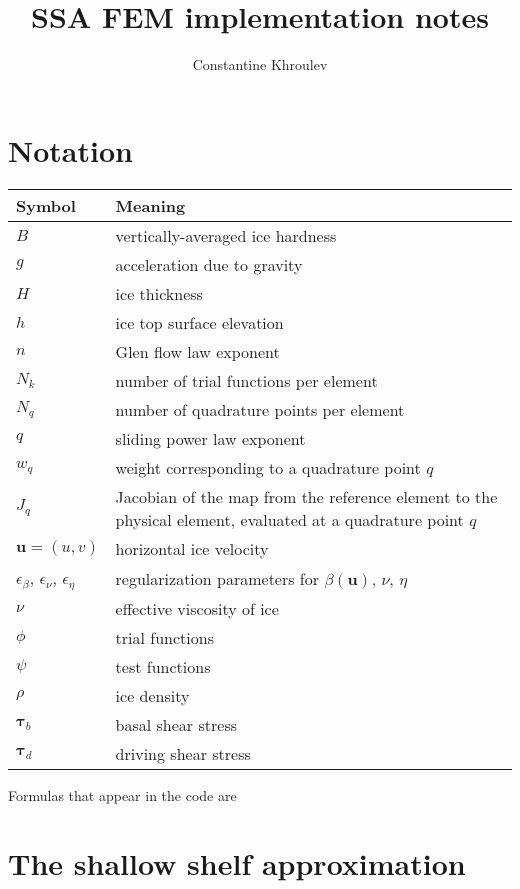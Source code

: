 \documentclass{amsart}
\newcommand{\betaU}{\beta(\boldsymbol{u})}
\newcommand{\basalshearstress}[1]{\boldsymbol{\tau}_{b#1}}
\newcommand{\taub}{\basalshearstress{}}
\newcommand{\drivingstress}[1]{\boldsymbol{\tau}_{d#1}}
\newcommand{\taud}{\drivingstress{}}
\newcommand{\highlight}[1]{{\color{red!80!black} \fbox{$ \displaystyle #1 $} }}
\begin{document}
\title{SSA FEM implementation notes}
\author{Constantine Khroulev}
\maketitle
\tableofcontents


\section{Notation}
\label{sec-1}

\begin{center}
\begin{tabular}{lp{}}
Symbol & Meaning\\
\hline
$B$ & vertically-averaged ice hardness\\
$g$ & acceleration due to gravity\\
$H$ & ice thickness\\
$h$ & ice top surface elevation\\
$n$ & Glen flow law exponent\\
$N_k$ & number of trial functions per element\\
$N_q$ & number of quadrature points per element\\
$q$ & sliding power law exponent\\
$w_q$ & weight corresponding to a quadrature point $q$\\
$J_q$ & Jacobian of the map from the reference element to the physical element, evaluated at a quadrature point $q$\\
$\boldsymbol{u} = (u,v)$ & horizontal ice velocity\\
$\epsilon_{\beta}$, $\epsilon_{\nu}$, $\epsilon_{\eta}$ & regularization parameters for $\betaU$, $\nu$, $\eta$\\
$\nu$ & effective viscosity of ice\\
$\phi$ & trial functions\\
$\psi$ & test functions\\
$\rho$ & ice density\\
$\taub$ & basal shear stress\\
$\taud$ & driving shear stress\\
\end{tabular}
\end{center}

Formulas that appear in the code are \highlight{highlighted.}

\section{The shallow shelf approximation}
\label{sec:ssa-strong}
\end{document}
